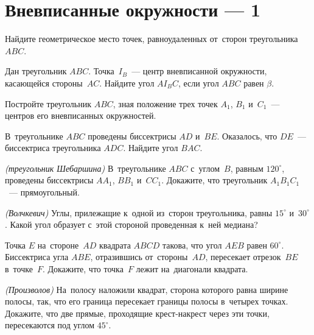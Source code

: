 
\section*{Вневписанные окружности --- 1}

\begin{problems}

\item
Найдите геометрическое место точек, равноудаленных от~сторон
треугольника $ABC$.

\item
Дан треугольник $ABC$.
Точка~$I_{B}$~--- центр вневписанной окружности, касающейся стороны~$AC$.
Найдите угол $A I_{B} C$, если угол $ABC$ равен $\beta$.

\item
Постройте треугольник $ABC$, зная положение трех точек $A_1$, $B_1$ и~$C_1$~---
центров его вневписанных окружностей.

\item
В~треугольнике $ABC$ проведены биссектрисы $AD$ и~$BE$.
Оказалось, что $DE$~--- биссектриса треугольника $ADC$.
Найдите угол $BAC$.

\item\emph{(треугольник Шебаршина)}
В~треугольнике $ABC$ с~углом~$B$, равным $120^{\circ}$\!, проведены биссектрисы
$A A_1$, $B B_1$ и~$C C_1$.
Докажите, что треугольник $A_1 B_1 C_1$~--- прямоугольный.

\item\emph{(Волчкевич)}
Углы, прилежащие к~одной из~сторон треугольника, равны $15^{\circ}$
и~$30^{\circ}$\!.
Какой угол образует с~этой стороной проведенная к~ней медиана?

\item
Точка $E$ на~стороне~$AD$ квадрата $ABCD$ такова, что угол $AEB$ равен
$60^{\circ}$.
Биссектриса угла $ABE$, отразившись от~стороны~$AD$, пересекает отрезок~$BE$
в~точке~$F$.
Докажите, что точка~$F$ лежит на~диагонали квадрата.

\item\emph{(Произволов)}
На~полосу наложили квадрат, сторона которого равна ширине полосы, так, что его
граница пересекает границы полосы в~четырех точках.
Докажите, что две прямые, проходящие крест-накрест через эти точки,
пересекаются под углом $45^{\circ}$.


\end{problems}

